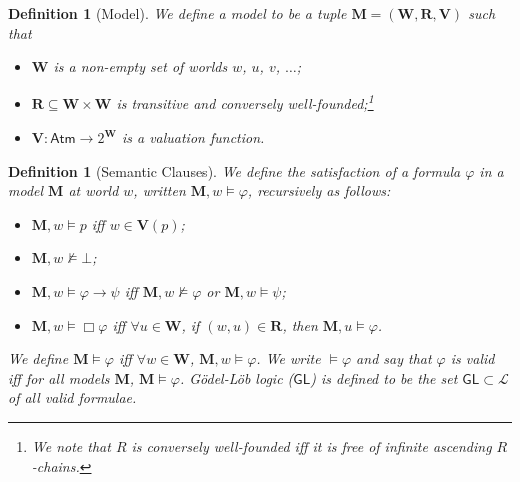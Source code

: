\documentclass[copyright,creativecommons]{eptcs}
\newtheorem{definition}[theorem]{Definition}
\newcommand{\logicgl}{\mathsf{GL}}
\newcommand{\semrel}{\models}
\newcommand{\notp}{\neg p}
\newcommand{\pdlbox}[1]{[#1]}
\newcommand{\pdldia}[1]{\langle #1 \rangle}
\newcommand{\iffi}{\textit{iff} }
\newcommand{\pra}{\alpha}
\renewcommand{\phi}{\varphi}
\newcommand{\imp}{\rightarrow}
\newcommand{\negnnf}[1]{\overline{#1}}
\newcommand{\atm}{\mathsf{Atm}}
\newcommand{\lang}{\mathscr{L}}
\newcommand{\M}{\mathbf{M}}
\newcommand{\W}{\mathbf{W}}
\newcommand{\R}{\mathbf{R}}
\newcommand{\V}{\mathbf{V}}
\begin{document}


\begin{definition}[Model]\label{def:model} We define a \emph{model} to be a tuple $\M = (\W,\R,\V)$ such that
\begin{itemize}[leftmargin=!, labelwidth=.5em, labelsep=.5em]

\item $\W$ is a non-empty set of worlds $w$, $u$, $v$, $\ldots$; %

\item $\R \subseteq \W \times \W$ is transitive and conversely well-founded;\footnote{We note that $R$ is conversely well-founded \iffi it is free of infinite ascending $R$-chains.}


\item $\V : \atm \to 2^{\W}$ is a \emph{valuation function}.

\end{itemize}
\end{definition}


\begin{definition}[Semantic Clauses]\label{def:semantics} 
We define the \emph{satisfaction} of a formula $\phi$ in a model $\M$ at world $w$, written $\M, w \semrel \phi$, recursively as follows:
\begin{itemize}[leftmargin=!, labelwidth=.5em, labelsep=.5em]

\item $\M,w \semrel p$ \iffi $w \in \V(p)$;

\item $\M,w \not\semrel \bot $;

\item $\M,w \semrel \phi \rightarrow \psi$ \iffi $\M,w \not\models \phi$ or $\M,w \semrel \psi$;

\item $\M,w \semrel \Box \phi$ \iffi $\forall u \in \W$, if $(w,u) \in \R$, then $\M,u \semrel \phi$.

\end{itemize}
We define $\M \semrel  \phi$ \iffi $\forall w \in \W$, $\M,w \semrel \phi$. We write $ \semrel \phi$ and say that $\phi$ is \emph{valid} \iffi for all models $\M$, $\M \semrel \phi$. \emph{G{\"o}del-L{\"o}b logic ($\logicgl$)} is defined to be the set $\logicgl \subset \lang$ of all valid formulae.
\end{definition}
\end{document}
